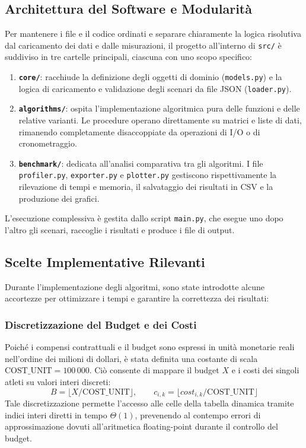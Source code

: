 \subsection{Architettura del Software e Modularità}
Per mantenere i file e il codice ordinati e separare chiaramente la logica risolutiva dal caricamento dei dati e dalle misurazioni, il progetto all'interno di \texttt{src/} è suddiviso in tre cartelle principali, ciascuna con uno scopo specifico:
\begin{enumerate}
	\item \textbf{\texttt{core/}}: racchiude la definizione degli oggetti di dominio (\texttt{models.py}) e la logica di caricamento e validazione degli scenari da file JSON (\texttt{loader.py}).
	\item \textbf{\texttt{algorithms/}}: ospita l'implementazione algoritmica pura delle funzioni e delle relative varianti. Le procedure operano direttamente su matrici e liste di dati, rimanendo completamente disaccoppiate da operazioni di I/O o di cronometraggio.
	\item \textbf{\texttt{benchmark/}}: dedicata all'analisi comparativa tra gli algoritmi. I file \texttt{profiler.py}, \texttt{exporter.py} e \texttt{plotter.py} gestiscono rispettivamente la rilevazione di tempi e memoria, il salvataggio dei risultati in CSV e la produzione dei grafici.
\end{enumerate}
L'esecuzione complessiva è gestita dallo script \texttt{main.py}, che esegue uno dopo l'altro gli scenari, raccoglie i risultati e produce i file di output.

\subsection{Scelte Implementative Rilevanti}
Durante l'implementazione degli algoritmi, sono state introdotte alcune accortezze per ottimizzare i tempi e garantire la correttezza dei risultati:

\subsubsection{Discretizzazione del Budget e dei Costi}
Poiché i compensi contrattuali e il budget sono espressi in unità monetarie reali nell'ordine dei milioni di dollari, è stata definita una costante di scala $\text{COST\_UNIT} = 100\,000$. Ciò consente di mappare il budget $X$ e i costi dei singoli atleti su valori interi discreti:
\begin{equation}
	B = \lfloor X / \text{COST\_UNIT} \rfloor, \qquad c_{i, k} = \lfloor \mathit{cost}_{i, k} / \text{COST\_UNIT} \rfloor
\end{equation}
Tale discretizzazione permette l'accesso alle celle della tabella dinamica tramite indici interi diretti in tempo $\Theta(1)$, prevenendo al contempo errori di approssimazione dovuti all'aritmetica floating-point durante il controllo del budget.

